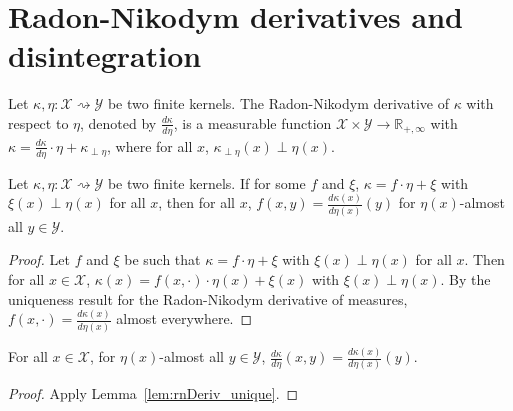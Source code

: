 \chapter{Radon-Nikodym derivatives and disintegration}

\begin{definition}
  \label{def:kernel_rnDeriv}
  \leanok
  Let $\kappa, \eta : \mathcal X \rightsquigarrow \mathcal Y$ be two finite kernels. The Radon-Nikodym derivative of $\kappa$ with respect to $\eta$, denoted by $\frac{d \kappa}{d \eta}$, is a measurable function $\mathcal X \times \mathcal Y \to \mathbb{R}_{+, \infty}$ with $\kappa = \frac{d \kappa}{d \eta} \cdot \eta + \kappa_{\perp \eta}$, where for all $x$, $\kappa_{\perp \eta}(x) \perp \eta(x)$.
\end{definition}

\begin{lemma}
  \label{lem:rnDeriv_unique}
  \leanok
  Let $\kappa, \eta : \mathcal X \rightsquigarrow \mathcal Y$ be two finite kernels. If for some $f$ and $\xi$, $\kappa = f \cdot \eta + \xi$ with $\xi(x) \perp \eta(x)$ for all $x$, then for all $x$, $f(x, y) = \frac{d \kappa(x)}{d \eta(x)}(y)$ for $\eta(x)$-almost all $y \in \mathcal Y$.
\end{lemma}

\begin{proof} \leanok
Let $f$ and $\xi$ be such that $\kappa = f \cdot \eta + \xi$ with $\xi(x) \perp \eta(x)$ for all $x$. Then for all $x \in \mathcal X$, $\kappa(x) = f(x, \cdot) \cdot \eta(x) + \xi(x)$ with $\xi(x) \perp \eta(x)$. By the uniqueness result for the Radon-Nikodym derivative of measures, $f(x, \cdot) = \frac{d \kappa(x)}{d \eta(x)}$ almost everywhere.
\end{proof}

\begin{corollary}
  \label{cor:rnDeriv_value}
  \leanok
  For all $x \in \mathcal X$, for $\eta(x)$-almost all $y \in \mathcal Y$, $\frac{d \kappa}{d \eta}(x, y) = \frac{d \kappa(x)}{d \eta(x)}(y)$.
\end{corollary}

\begin{proof} \leanok
{}
Apply Lemma~\ref{lem:rnDeriv_unique}.
\end{proof}




